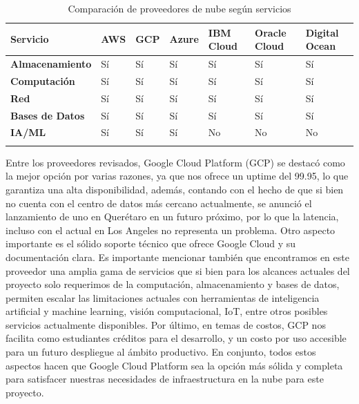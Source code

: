 \begin{longtable}{|m{3.5cm}|m{1.5cm}|m{1.5cm}|m{1.5cm}|m{1.5cm}|m{1.5cm}|m{1.5cm}|}
\hline
\textbf{Servicio} & \textbf{AWS} & \textbf{GCP} & \textbf{Azure} & \textbf{IBM Cloud} & \textbf{Oracle Cloud} & \textbf{Digital Ocean} \\
\hline
\textbf{Almacenamiento} & \cellcolor{green!25}Sí & \cellcolor{green!25}Sí & \cellcolor{green!25}Sí & \cellcolor{green!25}Sí & \cellcolor{green!25}Sí & \cellcolor{green!25}Sí \\
\hline
\textbf{Computación} & \cellcolor{green!25}Sí & \cellcolor{green!25}Sí & \cellcolor{green!25}Sí & \cellcolor{green!25}Sí & \cellcolor{green!25}Sí & \cellcolor{green!25}Sí \\
\hline
\textbf{Red} & \cellcolor{green!25}Sí & \cellcolor{green!25}Sí & \cellcolor{green!25}Sí & \cellcolor{green!25}Sí & \cellcolor{green!25}Sí & \cellcolor{green!25}Sí \\
\hline
\textbf{Bases de Datos} & \cellcolor{green!25}Sí & \cellcolor{green!25}Sí & \cellcolor{green!25}Sí & \cellcolor{green!25}Sí & \cellcolor{green!25}Sí & \cellcolor{green!25}Sí \\
\hline
\textbf{IA/ML} & \cellcolor{green!25}Sí & \cellcolor{green!25}Sí & \cellcolor{green!25}Sí & \cellcolor{red!25}No & \cellcolor{red!25}No & \cellcolor{red!25}No \\
\hline
\caption{Comparación de proveedores de nube según servicios \cite{comparecloud}}
\label{tab:comparacion_nube2}
\end{longtable}
%
Entre los proveedores revisados, Google Cloud Platform (GCP) se destacó como la mejor opción por varias razones, ya que nos ofrece un uptime del 99.95, lo que garantiza una alta disponibilidad, además, contando con el hecho de que si bien no cuenta con el centro de datos más cercano actualmente, se anunció el lanzamiento de uno en Querétaro en un futuro próximo, por lo que la latencia, incluso con el actual en Los Angeles no representa un problema. Otro aspecto importante es el sólido soporte técnico que ofrece Google Cloud y su documentación clara. Es importante mencionar también que encontramos en este proveedor una amplia gama de servicios que si bien para los alcances actuales del proyecto solo requerimos de la computación, almacenamiento y bases de datos, permiten escalar las limitaciones actuales con herramientas de inteligencia artificial y machine learning, visión computacional, IoT, entre otros posibles servicios actualmente disponibles. Por último, en temas de costos, GCP nos facilita como estudiantes créditos para el desarrollo, y un costo por uso accesible para un futuro despliegue al ámbito productivo. En conjunto, todos estos aspectos hacen que Google Cloud Platform sea la opción más sólida y completa para satisfacer nuestras necesidades de infraestructura en la nube para este proyecto.\\

